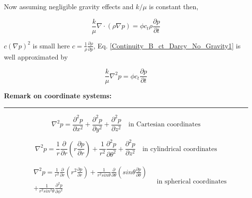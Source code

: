 \documentclass{llncs}
\numberwithin{equation}{section}
\numberwithin{figure}{section}
\numberwithin{table}{section}
\begin{document}
    Now assuming negligible gravity effects and $k/\mu$ is constant then,
    
    \begin{equation}
        \frac{k}{\mu }\nabla \cdot \left( \rho \nabla p \right)=\phi {{c}_{t}}\rho \frac{\partial p}{\partial t}
    \label{Continuity_B_ct_Darcy_No_Gravity1}
    \end{equation}    
    
     $c{{\left( \nabla p \right)}^{2}}$ is small here $c=\frac{1}{\rho }\frac{\partial \rho }{\partial p}$, Eq. \ref{Continuity_B_ct_Darcy_No_Gravity1} is well approximated by
    
    \begin{equation}
        \frac{k}{\mu }{{\nabla }^{2}}p=\phi {{c}_{t}}\frac{\partial p}{\partial t}
    \label{Continuity_B_ct_Darcy_No_Gravity1_approx}
    \end{equation}     
    
    \vspace{15pt}
    \large{\textbf{Remark on coordinate systems:}}\\
    \rule{\textwidth}{1pt}
    
    \begin{equation*}
        {{\nabla }^{2}}p=\frac{{{\partial }^{2}}p}{\partial {{x}^{2}}}+\frac{{{\partial }^{2}}p}{\partial {{y}^{2}}}+\frac{{{\partial }^{2}}p}{\partial {{z}^{2}}}\quad \text{in Cartesian coordinates}
    \label{Laplacian_Cartesian}
    \end{equation*}     

    \begin{equation*}
        {{\nabla }^{2}}p=\frac{1}{r}\frac{\partial }{\partial r}\left( r\frac{\partial p}{\partial r} \right)+\frac{1}{{{r}^{2}}}\frac{{{\partial }^{2}}p}{\partial {{\theta }^{2}}}+\frac{{{\partial }^{2}}p}{\partial {{z}^{2}}}\quad \text{in cylindrical coordinates}
    \label{Laplacian_Cylindrical}
    \end{equation*} 

    \begin{equation*}
        \begin{split}
    & {{\nabla }^{2}}p=\frac{1}{{{r}^{2}}}\frac{\partial }{\partial r}\left( {{r}^{2}}\frac{\partial p}{\partial r} \right)+\frac{1}{{{r}^{2}}sin\theta }\frac{\partial }{\partial \theta }\left( sin\theta \frac{\partial p}{\partial \theta } \right) \\
    & +\frac{1}{{{r}^{2}}si{{n}^{2}}\theta }\frac{{{\partial }^{2}}p}{\partial {{\phi }^{2}}} \\
    \end{split}\quad \text{in spherical coordinates}
    \label{Laplacian_Spherical}
    \end{equation*}     
    
\end{document}
